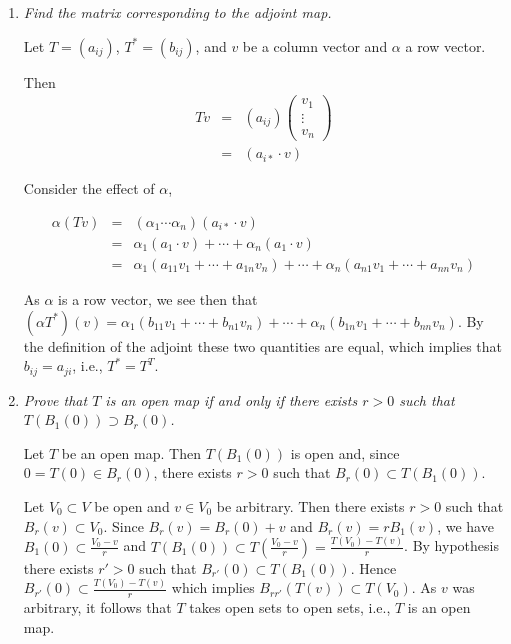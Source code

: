 \documentclass[11pt]{article}
\begin{document}
\begin{enumerate}
\newpage
\item \emph{Find the matrix corresponding to the adjoint map.}

Let $T = (a_{ij})$, $T^{\ast}=(b_{ij})$, and $v$ be a column vector and $\alpha$ a row vector.

Then
\begin{eqnarray*}
Tv &=& (a_{ij}) \left(\begin{array}{c} v_1 \\ \vdots \\ v_n \end{array} \right) \\
&=& (a_{i\ast} \cdot v)
\end{eqnarray*}

Consider the effect of $\alpha$,

\begin{eqnarray*}
\alpha(Tv) &=& ( \alpha_1 \cdots \alpha_n ) (a_{i\ast} \cdot v) \\
&=& \alpha_1(a_1 \cdot v) + \cdots + \alpha_n(a_1 \cdot v) \\
&=& \alpha_1(a_{11}v_1 + \cdots + a_{1n}v_n) + \cdots + \alpha_n(a_{n1}v_1 + \cdots + a_{nn}v_n)
\end{eqnarray*}

As $\alpha$ is a row vector, we see then that $(\alpha T^{\ast})(v) = \alpha_1(b_{11}v_1 + \cdots + b_{n1}v_n) + \cdots + \alpha_n(b_{1n}v_1 + \cdots + b_{nn}v_n)$.  By the definition of the adjoint these two quantities are equal, which implies that $b_{ij} = a_{ji}$, i.e., $T^{\ast} = T^T$. 

\item \emph{Prove that $T$ is an open map if and only if there exists $r > 0$ such that $T(B_1(0)) \supset B_r(0)$.}

Let $T$ be an open map.  Then $T(B_1(0))$ is open and, since $0 = T(0) \in B_r(0)$, there exists $r > 0$ such that $B_r(0) \subset T(B_1(0))$.

Let $V_0 \subset V$ be open and $v \in V_0$ be arbitrary.  Then there exists $r > 0$ such that $B_r(v) \subset V_0$.  Since $B_r(v) = B_r(0) + v$ and $B_r(v) = rB_1(v)$, we have $B_1(0) \subset \frac{V_0 - v}{r}$ and $T(B_1(0)) \subset T(\frac{V_0 - v}{r}) = \frac{T(V_0) - T(v)}{r}$.  By hypothesis there exists $r' > 0$ such that $B_{r'}(0) \subset T(B_1(0))$.  Hence $B_{r'}(0) \subset \frac{T(V_0) - T(v)}{r}$ which implies $B_{rr'}(T(v)) \subset T(V_0)$.  As $v$ was arbitrary, it follows that $T$ takes open sets to open sets, i.e., $T$ is an open map.


\end{enumerate}
\end{document}
